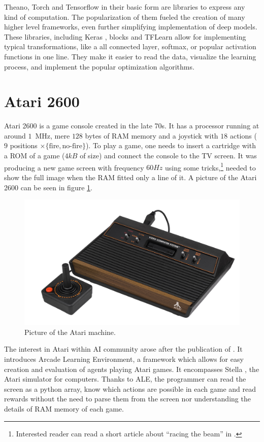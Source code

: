 Theano, Torch and Tensorflow in their basic form are libraries to express any kind of computation. The popularization of them fueled the creation of many higher level frameworks, even further simplifying implementation of deep models. These libraries, including Keras \cite{keras}, blocks \cite{blocks} and TFLearn \cite{tflearn} allow for implementing typical transformations, like a all connected layer, softmax, or popular activation functions in one line. They make it easier to read the data, visualize the learning process, and implement the popular optimization algorithms.

\section{Atari 2600}
Atari 2600 is a game console created in the late 70s. It has a processor running at around $1$~MHz, mere $128$ bytes of RAM memory and a joystick with $18$ actions ($9$ positions $\times \{\mbox{fire}, \mbox{no-fire}\}$). To play a game, one needs to insert a cartridge with a ROM of a game ($4kB$ of size) and connect the console to the TV screen. It was producing a new game screen with frequency $60Hz$ using some tricks,\footnote{Interested reader can read a short article about ``racing the beam'' in \cite{racing-beam}.} needed to show the full image when the RAM fitted only a line of it. A picture of the Atari 2600 can be seen in figure \ref{atari-picture}.

\begin{figure}
  \centering
  \includegraphics[width=.8\linewidth]{images/atari.jpg}
  \caption{Picture of the Atari machine.}\label{atari-picture}
\end{figure}

The interest in Atari within AI community arose after the publication of \cite{ale}. It introduces Arcade Learning Environment, a framework which allows for easy creation and evaluation of agents playing Atari games. It encompasses Stella \cite{stella}, the Atari simulator for computers. Thanks to ALE, the programmer can read the screen as a python array, know which actions are possible in each game and read rewards without the need to parse them from the screen nor understanding the details of RAM memory of each game.

